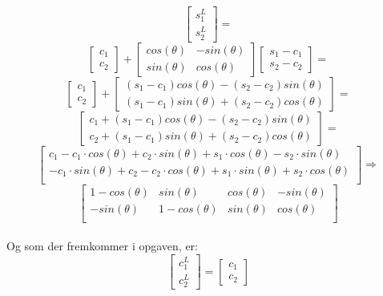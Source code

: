 \documentclass[a4paper,12pt]{article}
\begin{document}
\[
\left[\begin{array}{ccc}
    s^L_1\\
    s^L_2
\end{array}\right]
=
\]
\[
\left[\begin{array}{ccc}
    c_1\\
    c_2
\end{array}\right]
+
\left[\begin{array}{cc}
    cos(\theta) & -sin(\theta)\\
    sin(\theta) & cos(\theta)
\end{array}\right]
\left[\begin{array}{cc}
    s_1 -c_1\\
    s_2 -c_2
\end{array}\right]
=
\]
\[
\left[\begin{array}{ccc}
    c_1\\
    c_2
\end{array}\right]
+
\left[\begin{array}{c}
    (s_1-c_1)cos(\theta) - (s_2-c_2) sin(\theta) \\
    (s_1-c_1) sin(\theta) + (s_2-c_2) cos(\theta)
\end{array}\right]
=
\]
\[
\left[\begin{array}{c}
    c_1 +(s_1-c_1)cos(\theta) - (s_2-c_2) sin(\theta) \\
    c_2 + (s_1-c_1) sin(\theta) + (s_2-c_2) cos(\theta)
\end{array}\right]
=
\]
\[
\left[\begin{array}{cccc}
    c_1 - c_1\cdot cos(\theta) + c_2 \cdot sin(\theta) + s_1 \cdot cos(\theta) - s_2\cdot sin(\theta)\\
    -c_1\cdot sin(\theta) + c_2 - c_2 \cdot cos(\theta) + s_1 \cdot sin(\theta) + s_2\cdot cos(\theta)\\
\end{array}\right]
\Rightarrow
\]
\[
\left[\begin{array}{cccc}
    1 - cos(\theta) & sin(\theta) & cos(\theta) &  -sin(\theta)\\
    -sin(\theta) & 1 - cos(\theta) & sin(\theta) & cos(\theta)\\
\end{array}\right]
\]\\

Og som der fremkommer i opgaven, er:\\
\[
\left[\begin{array}{ccc}
    c^L_1\\
    c^L_2
\end{array}\right]
=
\left[\begin{array}{ccc}
    c_1\\
    c_2
\end{array}\right]
\]\\
\end{document}
